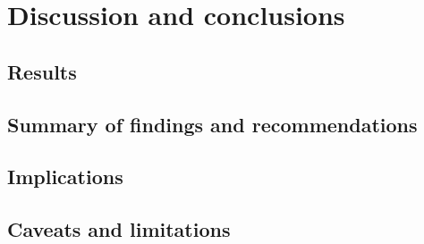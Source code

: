 \section{Discussion and conclusions}

\subsection{Results}

\subsection{Summary of findings and recommendations}

\subsection{Implications}

\subsection{Caveats and limitations}
